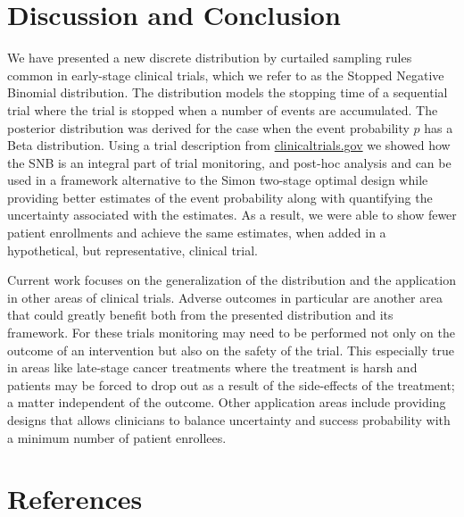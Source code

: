 \documentclass[12pt]{article}         %
\begin{document}
\section{Discussion and Conclusion}

We have presented a new discrete distribution by curtailed sampling rules common in early-stage clinical trials, which we refer to as the Stopped Negative Binomial distribution. The distribution models the stopping time of a sequential trial where the trial is stopped when a number of events are accumulated. The 
posterior distribution was derived for the case when the event probability $p$ 
has a Beta distribution. Using a trial description from 
\url{clinicaltrials.gov} we showed how the SNB is an integral part of trial 
monitoring, and post-hoc analysis and can be used in a framework alternative 
to the Simon two-stage optimal design while providing better estimates of the 
event probability along with quantifying the uncertainty associated with the 
estimates. As a result, we were able to show fewer patient enrollments and 
achieve the same estimates, when added in a hypothetical, but representative, 
clinical trial.

Current work focuses on the generalization of the distribution and the application in other areas of clinical trials. Adverse outcomes in particular are another area that could greatly benefit both from the presented distribution and its framework. For these trials monitoring may need to be performed not only on the outcome of an intervention but also on the safety of the trial. This especially 
true in areas like late-stage cancer treatments where the treatment is harsh 
and patients may be forced to drop out as a result of the side-effects of the 
treatment; a matter independent of the outcome. Other application areas 
include providing designs that allows clinicians to balance uncertainty and 
success probability with a minimum number of patient enrollees.



\section*     {\bf References}
\end{document}
